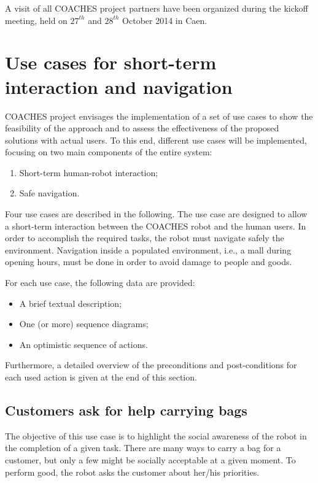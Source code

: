 A visit of all COACHES project partners have been organized during the kickoff meeting,
held on $27^{th}$ and $28^{th}$ October 2014 in Caen. 


\section{Use cases for short-term interaction and navigation}

COACHES project envisages the implementation of a set of use cases
to show the feasibility of the approach and to assess the effectiveness
of the proposed solutions with actual users.
To this end, different use cases will be implemented, focusing on two main
components of the entire system:
\begin{enumerate}
\item Short-term human-robot interaction;
\item Safe navigation.
\end{enumerate}

Four use cases are described in the following. The use case are designed
to allow a short-term interaction between the COACHES robot and the human users.
In order to accomplish the required tasks, the robot must navigate
safely the environment. Navigation inside a populated environment, i.e., a mall
during opening hours, must be done in order to avoid damage to people
and goods.

For each use case, the following data are provided:
\begin{itemize}
\item A brief textual description;
\item One (or more) sequence diagrams;
\item An optimistic sequence of actions.
\end{itemize}

Furthermore, a detailed overview of the preconditions and post-conditions for each
used action is given at the end of this section.


\subsection{Customers ask for help carrying bags}

The objective of this use case is to highlight the social awareness
of the robot in the completion of a given task. There are many ways
to carry a bag for a customer, but only a few might be socially acceptable
at a given moment. To perform good, the robot asks the customer about her/his priorities.

